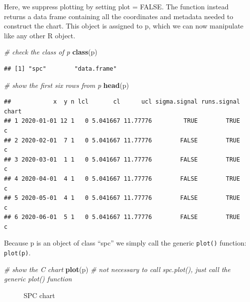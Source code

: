\documentclass[
]{book}
\makeatletter
\newenvironment{Shaded}{\begin{snugshade}}{\end{snugshade}}
\newcommand{\CommentTok}[1]{\textcolor[rgb]{0.56,0.35,0.01}{\textit{#1}}}
\newcommand{\FunctionTok}[1]{\textcolor[rgb]{0.13,0.29,0.53}{\textbf{#1}}}
\newcommand{\NormalTok}[1]{#1}
\newcommand*\pandocbounded[1]{%
  \sbox\pandoc@box{#1}%
  \Gscale@div\@tempa{\textheight}{\dimexpr\ht\pandoc@box+\dp\pandoc@box\relax}%
  \Gscale@div\@tempb{\linewidth}{\wd\pandoc@box}%
  \ifdim\@tempb\p@<\@tempa\p@\let\@tempa\@tempb\fi%
  \ifdim\@tempa\p@<\p@\scalebox{\@tempa}{\usebox\pandoc@box}%
  \else\usebox{\pandoc@box}%
  \fi%
}
\makeatother
\begin{document}
Here, we suppress plotting by setting plot = FALSE. The function instead
returns a data frame containing all the coordinates and metadata needed
to construct the chart. This object is assigned to p, which we can now
manipulate like any other R object.

\begin{Shaded}
\begin{Highlighting}[]
\CommentTok{\# check the class of p}
\FunctionTok{class}\NormalTok{(p)}
\end{Highlighting}
\end{Shaded}

\begin{verbatim}
## [1] "spc"        "data.frame"
\end{verbatim}

\begin{Shaded}
\begin{Highlighting}[]
\CommentTok{\# show the first six rows from p}
\FunctionTok{head}\NormalTok{(p)}
\end{Highlighting}
\end{Shaded}

\begin{verbatim}
##            x  y n lcl       cl      ucl sigma.signal runs.signal chart
## 1 2020-01-01 12 1   0 5.041667 11.77776         TRUE        TRUE     c
## 2 2020-02-01  7 1   0 5.041667 11.77776        FALSE        TRUE     c
## 3 2020-03-01  1 1   0 5.041667 11.77776        FALSE        TRUE     c
## 4 2020-04-01  4 1   0 5.041667 11.77776        FALSE        TRUE     c
## 5 2020-05-01  4 1   0 5.041667 11.77776        FALSE        TRUE     c
## 6 2020-06-01  5 1   0 5.041667 11.77776        FALSE        TRUE     c
\end{verbatim}

Because p is an object of class ``spc'' we simply call the generic
\texttt{plot()} function: \texttt{plot(p)}.

\begin{Shaded}
\begin{Highlighting}[]
\CommentTok{\# show the C chart}
\FunctionTok{plot}\NormalTok{(p) }\CommentTok{\# not necessary to call spc.plot(), just call the generic plot() function}
\end{Highlighting}
\end{Shaded}

\begin{figure}
\centering
\pandocbounded{}
\caption{SPC chart}
\end{figure}
\end{document}
